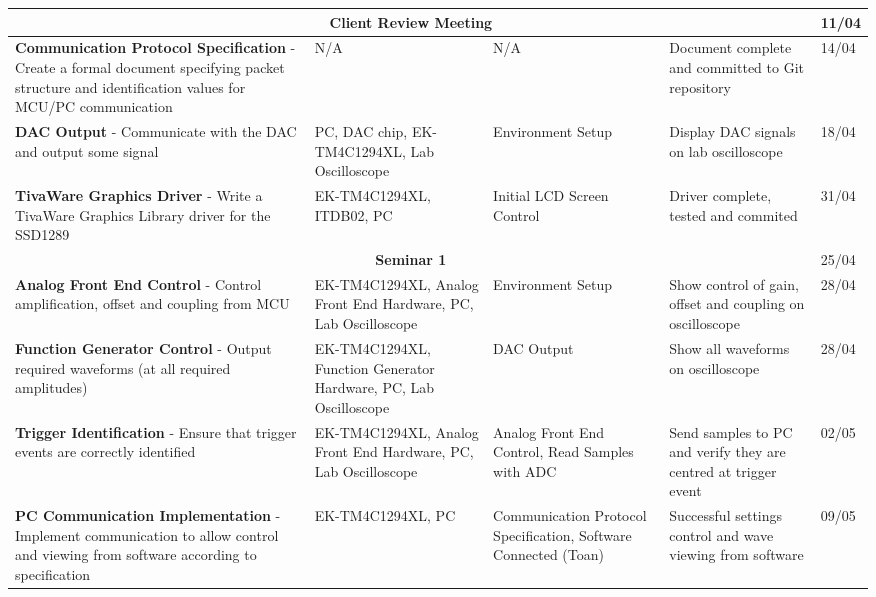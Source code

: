 \documentclass[12pt]{report}
\begin{document}
\begin{longtable}{|p{5cm}|p{4cm}|p{2.8cm}|p{2.5cm}|p{1.8cm}|}
	\hline
	\multicolumn{4}{|c|}{\textbf{Client Review Meeting}} & 11/04\\	
	
	\hline
	\textbf{Communication Protocol Specification} - Create a formal document specifying packet structure and identification values for MCU/PC communication &
	N/A &
	N/A &
	Document complete and committed to Git repository &
	14/04\\
	
	\hline
	\textbf{DAC Output} - Communicate with the DAC and output some signal &
	PC, DAC chip, \mbox{EK-TM4C1294XL}, Lab Oscilloscope &
	Environment Setup &
	Display DAC signals on lab oscilloscope &
	18/04\\
		
	\hline
	\textbf{TivaWare Graphics Driver} - Write a TivaWare Graphics Library driver for the SSD1289 &
	EK-TM4C1294XL, ITDB02, PC &
	Initial LCD Screen Control &
	Driver complete, tested and commited &
	31/04\\
	
	\hline
	\multicolumn{4}{|c|}{\textbf{Seminar 1}} & 25/04\\	
	
	\hline
	\textbf{Analog Front End Control} - Control amplification, offset and coupling from MCU &
	EK-TM4C1294XL, Analog Front End Hardware, PC, Lab Oscilloscope &
	Environment Setup &
	Show control of gain, offset and coupling on oscilloscope &
	28/04\\
			
	\hline
	\textbf{Function Generator Control} - Output required waveforms (at all required amplitudes) &
	EK-TM4C1294XL, Function Generator Hardware, PC, Lab Oscilloscope &
	DAC Output &
	Show all waveforms on oscilloscope &
	28/04\\
	
	\hline
	\textbf{Trigger Identification} - Ensure that trigger events are correctly identified &
	EK-TM4C1294XL, Analog Front End Hardware, PC, Lab Oscilloscope &
	Analog Front End Control, Read Samples with ADC &
	Send samples to PC and verify they are centred at trigger event &
	02/05\\
	
	\hline
	\textbf{PC Communication Implementation} - Implement communication to allow control and viewing from software according to specification &
	EK-TM4C1294XL, PC &
	Communication Protocol Specification, Software Connected (Toan) &
	Successful settings \hbox{control} and wave viewing from software &
	09/05\\
	

\end{longtable}
\end{document}
